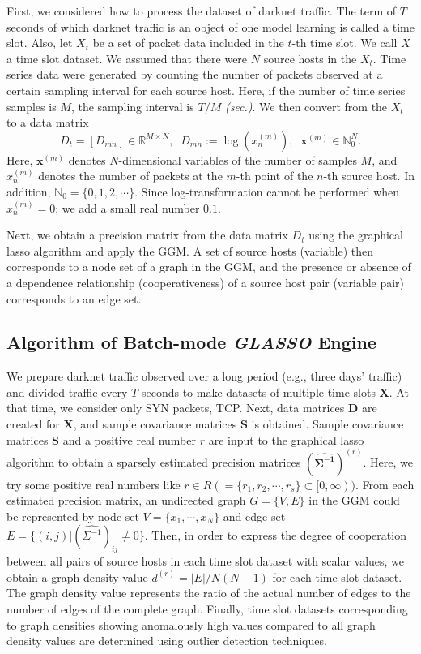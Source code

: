 \documentclass[conference]{IEEEtran}
\begin{document}
First, we considered how to process the dataset of darknet traffic.
The term of $T$ seconds of which darknet traffic is an object of one model learning is called a time slot.
Also, let $X_t$ be a set of packet data included in the $t$-th time slot.
We call $X$ a time slot dataset.
We assumed that there were $N$ source hosts in the $X_t$.
Time series data were generated by counting the number of packets observed at a certain sampling interval for each source host.
Here, if the number of time series samples is $M$, the sampling interval is $T/M$ \textit{(sec.)}.
We then convert from the $X_t$ to a data matrix
\begin{equation*}
D_t=[D_{mn}]\in\mathbb{R}^{M \times N},
\;\;D_{mn} := \log(x_n^{(m)}),
\;\;\bm{x}^{(m)}\in\mathbb{N}_0^{N}.
\end{equation*}
Here, $\bm{x}^{(m)}$ denotes $N$-dimensional variables of the number of samples $M$, and $x_n^{(m)}$ denotes the number of packets at the $m$-th point of the $n$-th source host.
In addition, $\mathbb{N}_0=\{0,1,2,\cdots\}$.
Since log-transformation cannot be performed when $x_n^{(m)}=0$; we add a small real number $0.1$.

Next, we obtain a precision matrix from the data matrix $D_t$ using the graphical lasso algorithm and apply the GGM.
A set of source hosts (variable) then corresponds to a node set of a graph in the GGM, and the presence or absence of a dependence relationship (cooperativeness) of a source host pair (variable pair) corresponds to an edge set.




\subsection{Algorithm of Batch-mode \textit{GLASSO} Engine}
\label{Batch}
We prepare darknet traffic observed over a long period (e.g., three days' traffic) and divided traffic every $T$ seconds to make datasets of multiple time slots $\bm{X}$.
At that time, we consider only SYN packets, TCP.
Next, data matrices $\bm{D}$ are created for $\bm{X}$, and sample covariance matrices $\bm{S}$ is obtained.
Sample covariance matrices $\bm{S}$ and a positive real number $r$ are input to the graphical lasso algorithm to obtain a sparsely estimated precision matrices ${\bm{(\hat{\Sigma^{-1}})}}^{(r)}$.
Here, we try some positive real numbers like $r \in R ( = \{r_1, r_2, \cdots, r_s\} \subset [0,\infty))$.
From each estimated precision matrix, an undirected graph $G = \{V, E\}$ in the GGM could be represented by node set $V=\{x_{1}, \cdots, x_{N}\}$ and edge set $E=\{(i,j)|{(\hat{\Sigma^{-1}})}_{ij}\neq0\}$.
Then, in order to express the degree of cooperation between all pairs of source hosts in each time slot dataset with scalar values, we obtain a graph density value $d^{(r)}=|E|/N(N-1)$ for each time slot dataset.
The graph density value represents the ratio of the actual number of edges to the number of edges of the complete graph.
Finally, time slot datasets corresponding to graph densities showing anomalously high values compared to all graph density values are determined using outlier detection techniques.
\end{document}
